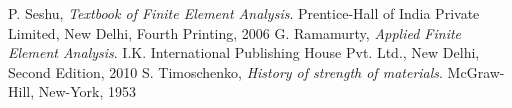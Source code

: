 
\begin{thebibliography}{9}

P. Seshu,
\emph{Textbook of Finite Element Analysis}.
Prentice-Hall of India Private Limited, New Delhi,
Fourth Printing, 2006
G. Ramamurty,
\emph{Applied Finite Element Analysis}.
I.K. International Publishing House Pvt. Ltd., New Delhi,
Second Edition, 2010
S. Timoschenko,
\emph{History of strength of materials}.
McGraw-Hill, New-York,
1953

\end{thebibliography}